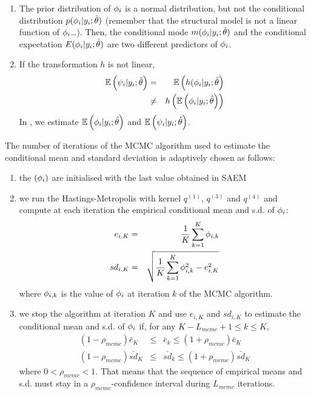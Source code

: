  \begin{enumerate}
  \item The prior distribution of ${{\phi}_i}$ is a normal distribution, but not the conditional distribution $p({{\phi}_i}|y_i;\hat{\theta})$ (remember that the structural model is not a linear function of ${{\phi}_i}$\ldots). Then, the conditional mode $m({{\phi}_i}|y_i;\hat{\theta})$ and the conditional expectation $ E({{\phi}_i}|y_i;\hat{\theta})$ are two different predictors of ${{\phi}_i}$.
  \item If the transformation $h$ is not linear,
      \begin{eqnarray*}
       \mathbb{E}\left({\psi_i}|y_i;\hat{\theta}\right) &=&  \mathbb{E}\left(h({{\phi}_i}|y_i;\hat{\theta}\right) \\
       &\neq& h\left(\mathbb{E}\left({{\phi}_i}|y_i;\hat{\theta}\right)  \right)
       \end{eqnarray*}
       In \monolix, we estimate $\mathbb{E}\left({{\phi}_i}|y_i;\hat{\theta}\right)$ and $\mathbb{E}\left({\psi_i}|y_i;\hat{\theta}\right)$.
\end{enumerate}

The number of iterations of the MCMC algorithm used to estimate the conditional mean and standard deviation is adaptively chosen as follows:
\begin{enumerate}
  \item the $({\phi}_i)$ are initialised with the last value obtained in SAEM
  \item we run the Hastings-Metropolis with kernel $q^{(1)}$, $q^{(3)}$ and $q^{(4)}$ and compute at each iteration the empirical conditional mean and s.d. of ${\phi}_i$:
  \begin{eqnarray}
  e_{i,K} &= &\frac{1}{K}\sum_{k=1}^K {\phi}_{i,k} \\
  sd_{i,K} &= &\sqrt{\frac{1}{K}\sum_{k=1}^K {\phi}_{i,k}^2 - e_{i,K}^2 }
  \end{eqnarray}
  where ${\phi}_{i,k}$ is the value of ${\phi}_i$ at iteration $k$ of the MCMC algorithm.
  \item we stop the algorithm at iteration $K$ and use $e_{i,K}$ and $sd_{i,K}$ to estimate the conditional mean and s.d. of ${\phi}_i$ if, for any $ K-L_{mcmc}+1 \leq k \leq K$,
  \begin{eqnarray}
  \label{Lmcmc}  (1-\rho_{mcmc})\bar{e}_K & \leq & \bar{e}_k \leq  (1+\rho_{mcmc})\bar{e}_{K} \\
  \nonumber  (1-\rho_{mcmc})\bar{sd}_{K} & \leq & \bar{sd}_{k} \leq  (1+\rho_{mcmc})\bar{sd}_{K}
  \end{eqnarray}
where $0<\rho_{mcmc}<1$. That means that the sequence of empirical means and s.d. must stay in a $\rho_{mcmc}$-confidence interval during $L_{mcmc}$ iterations.
\end{enumerate}

